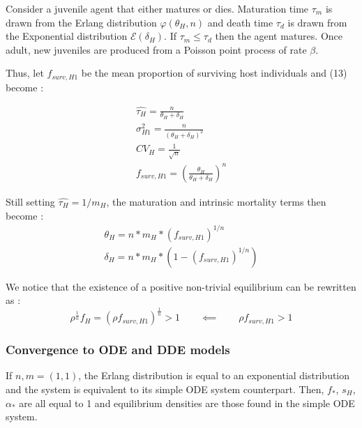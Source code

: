 \documentclass[12pt,a4paper,onecolumn]{article}
\begin{document}
Consider a juvenile agent that either matures or dies. Maturation time $\tau_m$ is drawn from the Erlang distribution $\varphi(\theta_H, n)$ and death time $\tau_d$ is drawn from the Exponential distribution $\mathcal{E}(\delta_H)$. If $\tau_m \leq \tau_d$ then the agent matures. Once adult, new juveniles are produced from a Poisson point process of rate $\beta$.

Thus, let $f_{surv,H1}$ be the mean proportion of surviving host individuals and (13) become :

\begin{align}
\hat{\tau_{H}} = \frac{n}{\theta_{H} + \delta_{H}} \nonumber \\
\sigma^2_{H1} = \frac{n}{(\theta_{H} + \delta_{H})^2} \\
CV_{H} = \frac{1}{\sqrt{n}} \\
f_{surv,H1} = (\frac{\theta_{H}}{\theta_{H} + \delta_{H}})^n
\end{align}

Still setting $\hat{\tau_{H}} = 1/m_H$, the maturation and intrinsic mortality terms then become :
\begin{equation}
\begin{alignedat}{2}
\theta_{H} = n * m_{H}* (f_{surv,H1})^{1/n} \\
\delta_{H} = n* m_{H}* (1-(f_{surv,H1})^{1/n})
\end{alignedat}
\end{equation}

We notice that the existence of a positive non-trivial equilibrium can be rewritten as :
$$\rho^{\frac{1}{n}}f_H = (\rho f_{surv,H1})^{\frac{1}{n}} > 1 \qquad \impliedby \qquad \rho f_{surv,H1} > 1$$

\subsubsection{Convergence to ODE and DDE models}
If $n,m = (1,1)$, the Erlang distribution is equal to an exponential distribution and the system is equivalent to its simple ODE system counterpart. Then, $f_*$, $s_H$, $\alpha_*$ are all equal to 1 and equilibrium densities are those found in the simple ODE system. \\ \\
\end{document}
